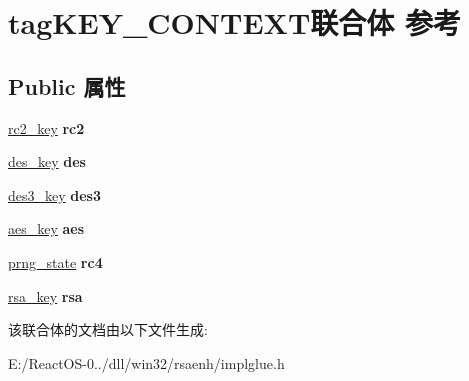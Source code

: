 \hypertarget{uniontag_k_e_y___c_o_n_t_e_x_t}{}\section{tag\+K\+E\+Y\+\_\+\+C\+O\+N\+T\+E\+X\+T联合体 参考}
\label{uniontag_k_e_y___c_o_n_t_e_x_t}
\subsection*{Public 属性}
\begin{DoxyCompactItemize}
\item 
\mbox{\label{uniontag_k_e_y___c_o_n_t_e_x_t_af5862168fa97c593dbdcbd4ecfce86b3}} 
\hyperlink{structtag__rc2__key}{rc2\+\_\+key} {\bfseries rc2}
\item 
\mbox{\label{uniontag_k_e_y___c_o_n_t_e_x_t_abb1b88f872f46987794d738b203f21a6}} 
\hyperlink{structtag__des__key}{des\+\_\+key} {\bfseries des}
\item 
\mbox{\label{uniontag_k_e_y___c_o_n_t_e_x_t_a08201b8f4fceca74d969404be14b719d}} 
\hyperlink{structtag__des3__key}{des3\+\_\+key} {\bfseries des3}
\item 
\mbox{\label{uniontag_k_e_y___c_o_n_t_e_x_t_aa1343ec338627d29c298605e5b42a986}} 
\hyperlink{structtag__aes__key}{aes\+\_\+key} {\bfseries aes}
\item 
\mbox{\label{uniontag_k_e_y___c_o_n_t_e_x_t_a4ee9d0a1f2cf7c22e71bff2d036fc02d}} 
\hyperlink{union_prng__state}{prng\+\_\+state} {\bfseries rc4}
\item 
\mbox{\label{uniontag_k_e_y___c_o_n_t_e_x_t_a6e777d46e1e1b474535cf9f0af796056}} 
\hyperlink{struct_rsa__key}{rsa\+\_\+key} {\bfseries rsa}
\end{DoxyCompactItemize}


该联合体的文档由以下文件生成\+:\begin{DoxyCompactItemize}
\item 
E\+:/\+React\+O\+S-\/0../dll/win32/rsaenh/implglue.\+h\end{DoxyCompactItemize}
